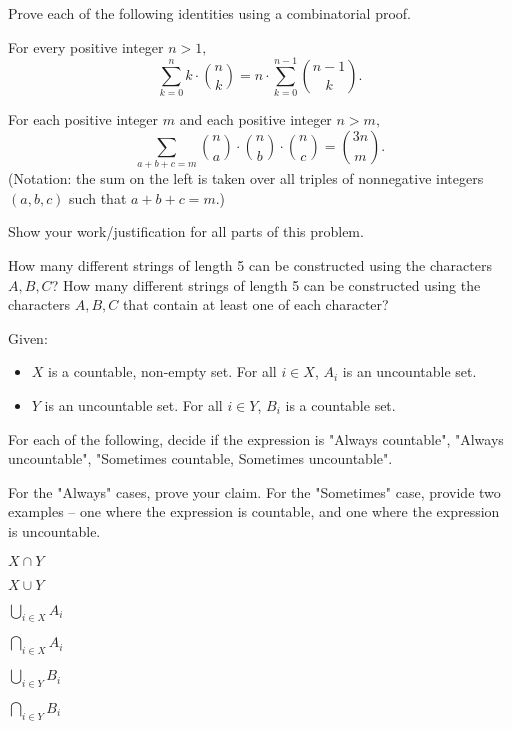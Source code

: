 \documentclass[11pt]{article}
\begin{document}
Prove each of the following identities using a combinatorial proof.

\begin{Parts}

\Part For every positive integer $n>1,$ 
\[\sum_{k=0}^n k \cdot \binom{n}{k} = n\cdot \sum_{k=0}^{n - 1}\binom{n - 1}{k}.\]

\Part For each positive integer $m$ and each positive integer $n > m,$
\[\sum_{a + b + c = m} \binom{n}{a}\cdot\binom{n}{b}\cdot\binom{n}{c} = \binom{3n}{m}.\]
(Notation: the sum on the left is taken over all triples of nonnegative integers $(a,b,c)$ such that $a + b + c = m.$)

\end{Parts}


Show your work/justification for all parts of this problem.
\begin{Parts}
    \Part How many different strings of length 5 can be constructed using the characters $A, B, C$?
    \Part How many different strings of length 5 can be constructed using the characters $A, B, C$ that contain at least one of each character?
\end{Parts}


Given:
\begin{itemize}
\item $X$ is a countable, non-empty set. For all $i \in X$, $A_i$ is an uncountable set.
\item $Y$ is an uncountable set. For all $i \in Y$, $B_i$ is a countable set.
\end{itemize}

For each of the following, decide if the expression is
"Always countable", "Always uncountable", "Sometimes countable,
Sometimes uncountable".

For the "Always" cases, prove your claim. For the "Sometimes" case, provide
two examples -- one where the expression is countable, and one where
the expression is uncountable.

\begin{Parts}

\Part $X \cap Y$


\Part $X \cup Y$

	
\Part $\bigcup_{i \in X} A_i$


\Part $\bigcap_{i \in X} A_i$


\Part $\bigcup_{i \in Y} B_i$


\Part $\bigcap_{i \in Y} B_i$




\end{Parts}
\end{document}
